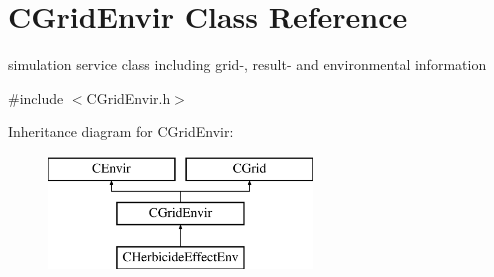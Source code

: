 \hypertarget{class_c_grid_envir}{}\section{C\+Grid\+Envir Class Reference}
\label{class_c_grid_envir}


simulation service class including grid-\/, result-\/ and environmental information  




{\ttfamily \#include $<$C\+Grid\+Envir.\+h$>$}

Inheritance diagram for C\+Grid\+Envir\+:\begin{figure}[H]
\begin{center}
\leavevmode
\includegraphics[height=3.000000cm]{class_c_grid_envir}
\end{center}
\end{figure}
